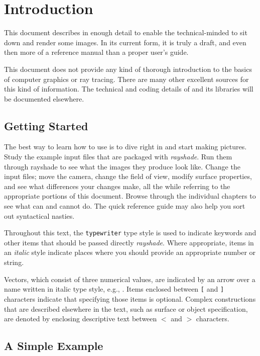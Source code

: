 \chapter{Introduction}

This document describes \rayshade in enough detail to enable
the technical-minded to
sit down and render some images.  In its current form,
it is truly a draft, and even then
more of a reference manual than a proper user's guide.

This document does not provide any kind of thorough introduction
to the basics of computer graphics or ray tracing.
There are many other excellent sources for this kind of information.
The technical and coding details of \rayshade and
its libraries will be documented elsewhere.

\section{Getting Started}

The best way to learn how to use \rayshade is to dive right in and
start making pictures.  Study the example
input files that are packaged with {\em rayshade}.  Run them through
rayshade to see what the images they produce look like.
Change the input files; move the camera,
change the field of view, modify surface properties, and see what differences
your changes make, all the while referring to the appropriate portions
of this document.  Browse through the individual chapters
to see what \rayshade can and cannot do.  The \rayshade quick reference
guide may also help you sort out syntactical nasties.

Throughout this text, the {\tt typewriter} type style is used to indicate
keywords and other items that should be passed
directly {\em rayshade}.  Where appropriate,
items in an {\em italic\/} style indicate
places where you should provide an appropriate number or string.

Vectors, which consist of three numerical values, are indicated by
an arrow over a name written in italic type style, e.g., .
Items enclosed between {\tt [} and {\tt ]} characters indicate
that specifying those items is optional.
Complex constructions that are
described elsewhere in the text, such as surface or object specification,
are denoted by enclosing descriptive text between 
{\tt $<$} and {\tt $>$} characters.

\section{A Simple Example}

